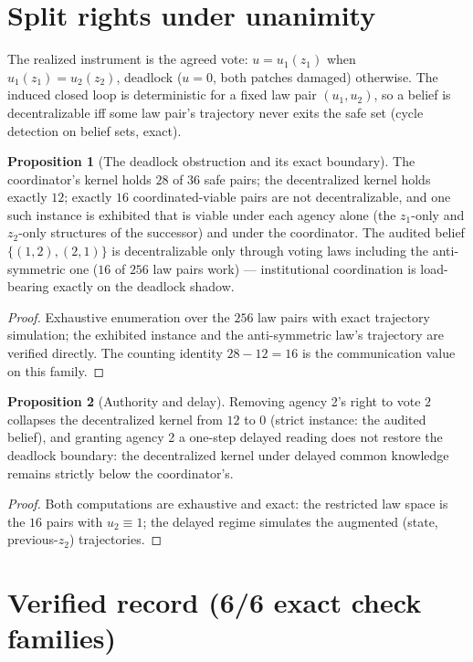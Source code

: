 \documentclass[10pt,twocolumn]{article}
\theoremstyle{definition}
\newtheorem{proposition}{Proposition}
\begin{document}
\section{Split rights under unanimity}

The realized instrument is the agreed vote: $u=u_1(z_1)$ when
$u_1(z_1)=u_2(z_2)$, deadlock ($u=0$, both patches damaged) otherwise.
The induced closed loop is deterministic for a fixed law pair
$(u_1,u_2)$, so a belief is decentralizable iff some law pair's
trajectory never exits the safe set (cycle detection on belief sets,
exact).

\begin{proposition}[The deadlock obstruction and its exact boundary]
\label{prop:deadlock}
The coordinator's kernel holds $28$ of $36$ safe pairs; the decentralized
kernel holds exactly $12$; exactly $16$ coordinated-viable pairs are not
decentralizable, and one such instance is exhibited that is viable under
each agency alone (the $z_1$-only and $z_2$-only structures of the
successor) and under the coordinator. The audited belief
$\{(1,2),(2,1)\}$ is decentralizable only through voting laws including
the anti-symmetric one ($16$ of $256$ law pairs work) --- institutional
coordination is load-bearing exactly on the deadlock shadow.
\end{proposition}
\begin{proof}
Exhaustive enumeration over the $256$ law pairs with exact trajectory
simulation; the exhibited instance and the anti-symmetric law's
trajectory are verified directly. The counting identity
$28-12=16$ is the communication value on this family.
\end{proof}

\begin{proposition}[Authority and delay]
Removing agency 2's right to vote $2$ collapses the decentralized kernel
from $12$ to $0$ (strict instance: the audited belief), and granting
agency 2 a one-step delayed reading does not restore the deadlock
boundary: the decentralized kernel under delayed common knowledge remains
strictly below the coordinator's.
\end{proposition}
\begin{proof}
Both computations are exhaustive and exact: the restricted law space is
the $16$ pairs with $u_2\equiv1$; the delayed regime simulates the
augmented (state, previous-$z_2$) trajectories.
\end{proof}

\section{Verified record (6/6 exact check families)}
\end{document}
